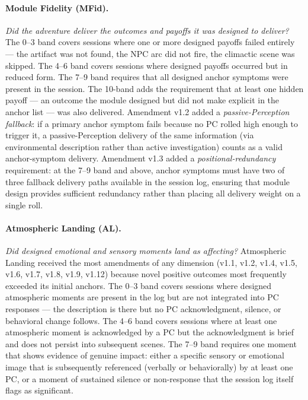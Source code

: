 \paragraph{Module Fidelity (MFid).}
\textit{Did the adventure deliver the outcomes and payoffs it was designed to deliver?}
The 0--3 band covers sessions where one or more designed payoffs failed entirely ---
the artifact was not found, the NPC arc did not fire, the climactic scene was skipped.
The 4--6 band covers sessions where designed payoffs occurred but in reduced form.
The 7--9 band requires that all designed anchor symptoms were present in the session.
The 10-band adds the requirement that at least one hidden payoff --- an outcome the
module designed but did not make explicit in the anchor list --- was also delivered.
Amendment v1.2 added a \textit{passive-Perception fallback}: if a primary anchor symptom
fails because no PC rolled high enough to trigger it, a passive-Perception delivery of
the same information (via environmental description rather than active investigation)
counts as a valid anchor-symptom delivery. Amendment v1.3 added a
\textit{positional-redundancy} requirement: at the 7--9 band and above, anchor symptoms
must have two of three fallback delivery paths available in the session log, ensuring
that module design provides sufficient redundancy rather than placing all delivery
weight on a single roll.

\paragraph{Atmospheric Landing (AL).}
\textit{Did designed emotional and sensory moments land as affecting?}
Atmospheric Landing received the most amendments of any dimension (v1.1, v1.2, v1.4,
v1.5, v1.6, v1.7, v1.8, v1.9, v1.12) because novel positive outcomes most frequently
exceeded its initial anchors. The 0--3 band covers sessions where designed atmospheric
moments are present in the log but are not integrated into PC responses --- the
description is there but no PC acknowledgment, silence, or behavioral change follows.
The 4--6 band covers sessions where at least one atmospheric moment is acknowledged
by a PC but the acknowledgment is brief and does not persist into subsequent scenes.
The 7--9 band requires one moment that shows evidence of genuine impact: either a
specific sensory or emotional image that is subsequently referenced (verbally or
behaviorally) by at least one PC, or a moment of sustained silence or non-response
that the session log itself flags as significant.

